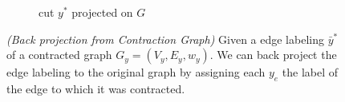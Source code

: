 \begin{center}
\begin{figure}[h]
\begin{subfigure}[t]{0.4\linewidth}
{
    }
\caption{ cut $y^*$ projected on $G$}
\label{fig:cont_d}
\end{subfigure}
\hfill
\caption{\emph{(Back projection from Contraction Graph)}
Given a edge labeling $\bar{y}^*$ of a contracted graph $G_y=(V_y,E_y, w_y)$.
We can back project the edge labeling to the original graph by 
assigning each $y_e$ the label of the edge to which it was contracted. 
}\label{fig:projection}
\end{figure}
\end{center}



